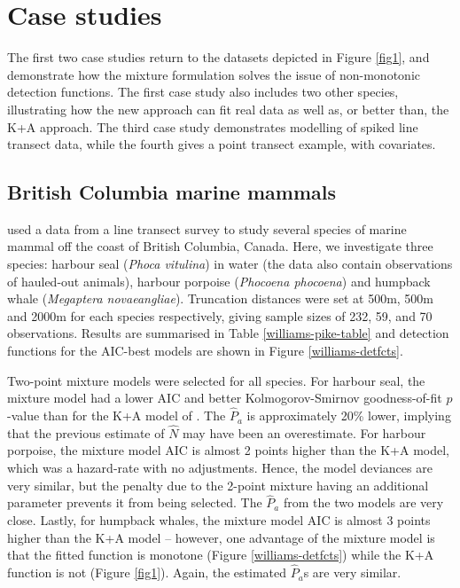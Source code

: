 \documentclass[useAMS,referee,usenatbib]{biom}
\begin{document}
\section{Case studies}
\label{s:data}

The first two case studies return to the datasets depicted in Figure \ref{fig1}, and demonstrate how the mixture formulation solves the issue of non-monotonic detection functions.  The first case study also includes two other species, illustrating how the new approach can fit real data as well as, or better than, the K+A approach.  The third case study demonstrates modelling of spiked line transect data, while the fourth gives a point transect example, with covariates.

\subsection{British Columbia marine mammals}

\cite{Williams:2007tc} used a data from a line transect survey to study several species of marine mammal off the coast of British Columbia, Canada. Here, we investigate three species: harbour seal (\textit{Phoca vitulina}) in water (the data also contain observations of hauled-out animals), harbour porpoise (\textit{Phocoena phocoena}) and humpback whale (\textit{Megaptera novaeangliae}). Truncation distances were set at 500m, 500m and 2000m for each species respectively, giving sample sizes of 232, 59, and 70 observations. Results are summarised in Table \ref{williams-pike-table} and detection functions for the AIC-best models are shown in Figure \ref{williams-detfcts}.

Two-point mixture models were selected for all species.  For harbour seal, the mixture model had a lower AIC and better Kolmogorov-Smirnov goodness-of-fit $p$-value than for the K+A model of \cite{Williams:2007tc}.  The $\hat{P}_a$ is approximately 20\% lower, implying that the previous estimate of $\hat{N}$ may have been an overestimate.  For harbour porpoise, the mixture model AIC is almost 2 points higher than the K+A model, which was a hazard-rate with no adjustments.  Hence, the model deviances are very similar, but the penalty due to the 2-point mixture having an additional parameter prevents it from being selected.  The $\hat{P}_a$ from the two models are very close.  Lastly, for humpback whales, the mixture model AIC is almost 3 points higher than the K+A model -- however, one advantage of the mixture model is that the fitted function is monotone (Figure \ref{williams-detfcts}) while the K+A function is not (Figure \ref{fig1}).  Again, the estimated $\hat{P}_a$s are very similar.
\end{document}
